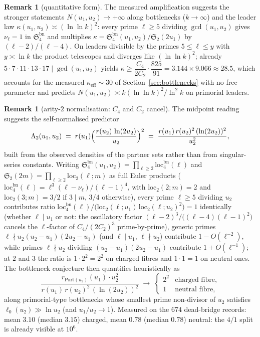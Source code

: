 \documentclass[11pt]{article}
\theoremstyle{plain}
\theoremstyle{definition}
\newtheorem{remark}[theorem]{Remark}
\newcommand{\rch}{r}
\begin{document}
\begin{remark}[quantitative form]\label{rem:quantA}
The measured amplification suggests the stronger statements
$N(u_1,u_2) \to +\infty$ along bottlenecks ($k \to \infty$) and
the leader law $\kappa(u_1,u_2) \asymp (\ln\ln k)^2$: every prime
$\ell \ge 5$ dividing $\gcd(u_1,u_2)$ gives $\nu_\ell = 1$ in
$\mathfrak{S}_4^{\mathrm{bn}}$ and multiplies
$\kappa = \mathfrak{S}_4^{\mathrm{bn}}(u_1,u_2)/\mathfrak{S}_2(2u_1)$
by $(\ell-2)/(\ell-4)$. On leaders divisible by the primes
$5 \le \ell \le y$ with $y \asymp \ln k$ the product telescopes
and diverges like $(\ln\ln k)^2$; already
$5 \cdot 7 \cdot 11 \cdot 13 \cdot 17 \mid \gcd(u_1,u_2)$ yields
$\kappa \ge \dfrac{C_4}{2C_2}\cdot\dfrac{825}{91}
= 3.144 \times 9.066 \approx 28.5$, which accounts for the
measured $\kappa_{\mathrm{eff}} \sim 30$ of
Section~\ref{sec:bottlenecks} with no free parameter and predicts
$N(u_1,u_2) \asymp k (\ln\ln k)^2 / \ln^2 k$ on primorial leaders.
\end{remark}

\begin{remark}[arity-$2$ normalisation: $C_4$ and $C_2$ cancel]
\label{rem:lambda2}
The midpoint reading suggests the self-normalised predictor
\[
\Lambda_2(u_1,u_2)
 \;=\; \rch(u_1)\Bigl(\frac{\rch(u_2)\,\ln(2u_2)}{u_2}\Bigr)^2
 \;=\; \frac{\rch(u_1)\,\rch(u_2)^2\,(\ln(2u_2))^2}{u_2^2},
\]
built from the observed densities of the partner sets rather than
from singular-series constants. Writing
$\mathfrak{S}_4^{\mathrm{bn}}(u_1,u_2) =
\prod_{\ell \ge 2}\mathrm{loc}_4^{\mathrm{bn}}(\ell)$ and
$\mathfrak{S}_2(2m) = \prod_{\ell \ge 2}\mathrm{loc}_2(\ell;m)$ as
full Euler products
($\mathrm{loc}_4^{\mathrm{bn}}(\ell) =
\ell^{3}(\ell-\nu_{\ell})/(\ell-1)^{4}$, with
$\mathrm{loc}_2(2;m) = 2$ and $\mathrm{loc}_2(3;m) = 3/2$ if
$3 \mid m$, $3/4$ otherwise), every prime $\ell \ge 5$ dividing
$u_2$ contributes ratio
$\mathrm{loc}_4^{\mathrm{bn}}(\ell)/
 \bigl(\mathrm{loc}_2(\ell;u_1)\,\mathrm{loc}_2(\ell;u_2)^{2}\bigr)
 = 1$ identically (whether $\ell \mid u_1$ or not: the oscillatory
factor $(\ell-2)^{3}/\bigl((\ell-4)(\ell-1)^{2}\bigr)$ cancels the
$\ell$-factor of $C_4/(2C_2)^{3}$ prime-by-prime), generic primes
$\ell \nmid u_2(u_2-u_1)(2u_2-u_1)$ (and $\ell \mid u_1$,
$\ell \nmid u_2$) contribute $1 - O(\ell^{-2})$, while primes
$\ell \nmid u_2$ dividing $(u_2-u_1)(2u_2-u_1)$ contribute
$1 + O(\ell^{-1})$; at $2$ and $3$ the ratio is
$1 \cdot 2^{2} = 2^{2}$ on charged fibres and
$1 \cdot 1 = 1$ on neutral ones. The bottleneck conjecture then
quantifies heuristically as
\[
\frac{r_{\mathrm{Part}(u_2)}(u_1)\cdot u_2^{2}}
     {\rch(u_1)\,\rch(u_2)^2\,(\ln(2u_2))^2}
 \;\longrightarrow\;
 \begin{cases} 2^2 & \text{charged fibre},\\ 1 & \text{neutral fibre},
 \end{cases}
\]
along primorial-type bottlenecks whose smallest prime
non-divisor of $u_2$ satisfies $\ell_0(u_2) \gg \ln u_2$
(and $u_1/u_2 \to 1$). Measured on the $674$ dead-bridge records:
mean $3.10$ (median $3.15$) charged, mean $0.78$ (median $0.78$)
neutral: the $4/1$ split is already visible at $10^{6}$.
\end{remark}
\end{document}
